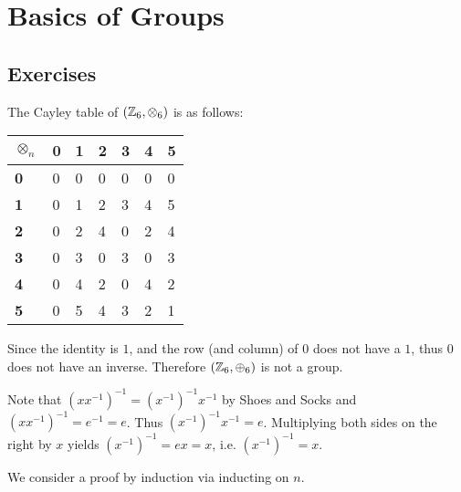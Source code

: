 \section{Basics of Groups}
\subsection*{Exercises}
\begin{questions}
    \item The Cayley table of $(\mathbb{Z}_6, \otimes_6)$ is as follows:
    \begin{table}[H]
        \centering
        \begin{tabular}{|l|l|l|l|l|l|l|}
        \hline
        \textbf{$\otimes_n$} & \textbf{0} & \textbf{1} & \textbf{2} & \textbf{3} & \textbf{4} & \textbf{5} \\ \hline
        \textbf{0}       & 0          & 0          & 0          & 0          & 0          & 0          \\ \hline
        \textbf{1}       & 0          & 1          & 2          & 3          & 4          & 5          \\ \hline
        \textbf{2}       & 0          & 2          & 4          & 0          & 2          & 4          \\ \hline
        \textbf{3}       & 0          & 3          & 0          & 3          & 0          & 3          \\ \hline
        \textbf{4}       & 0          & 4          & 2          & 0          & 4          & 2          \\ \hline
        \textbf{5}       & 0          & 5          & 4          & 3          & 2          & 1          \\ \hline
        \end{tabular}
    \end{table}

    Since the identity is $1$, and the row (and column) of 0 does not have a $1$, thus $0$ does not have an inverse. Therefore $(\mathbb{Z}_6, \oplus_6)$ is not a group.

    \item Note that $(xx^{-1})^{-1} = (x^{-1})^{-1}x^{-1}$ by Shoes and Socks and $(xx^{-1})^{-1} = e^{-1} = e$. Thus $(x^{-1})^{-1}x^{-1} = e$. Multiplying both sides on the right by $x$ yields $(x^{-1})^{-1} = ex = x$, i.e. $(x^{-1})^{-1} = x$.

    \item We consider a proof by induction via inducting on $n$.


\end{questions}
